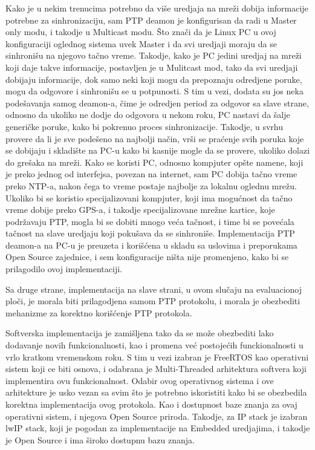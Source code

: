 \documentclass[a4paper,12pt, master]{etf}
\begin{document}
	Kako je u nekim trenucima potrebno da vi\v{s}e uredjaja na mre\v{z}i dobija
	informacije potrebne za sinhronizaciju, sam PTP deamon je konfigurisan da
	radi u Master only modu, i takodje u Multicast modu. \v{S}to zna\v{c}i da
	je Linux PC u ovoj konfiguraciji oglednog sistema uvek Master i da svi
	uredjaji moraju da se sinhroni\v{s}u na njegovo ta\v{c}no vreme. Takodje,
	kako je PC jedini uredjaj na mre\v{z}i koji daje takve informacije,
	postavljen je u Mulitcast mod, tako da svi uredjaji dobijaju informacije,
	dok samo neki koji mogu da prepoznaju odredjene poruke, mogu da odgovore i
	sinhroni\v{s}u se u potpunosti. S tim u vezi, dodata su jos neka
	pode\v{s}avanja samog deamon-a, \v{c}ime je odredjen period za odgovor sa
	slave strane, odnosno da ukoliko ne dodje do odgovora u nekom roku, PC
	nastavi da \v{s}alje generi\v{c}ke poruke, kako bi pokrenuo proces
	sinhronizacije. Takodje, u svrhu provere da li je sve pode\v{s}eno na
	najbolji na\v{c}in, vr\v{s}i se pra\'{c}enje svih poruka koje se dobijaju i
	skladi\v{s}te na PC-u kako bi kasnije mogle da se provere, ukoliko dolazi
	do gre\v{s}aka na mre\v{z}i. Kako se koristi PC, odnosno kompjuter
	op\v{s}te namene, koji je preko jednog od interfejsa, povezan na internet,
	sam PC dobija ta\v{c}no vreme preko NTP-a, nakon \v{c}ega to vreme postaje
	najbolje za lokalnu oglednu mre\v{z}u. Ukoliko bi se koristio
	specijalizovani kompjuter, koji ima mogu\'{c}nost da ta\v{c}no vreme dobije
	preko GPS-a, i takodje specijalizovane mre\v{z}ne kartice, koje
	podr\v{z}avaju PTP, mogla bi se dobiti mnogo ve\'{c}a ta\v{c}nost, i time
	bi se pove\'{c}ala ta\v{c}nost na slave uredjaju koji poku\v{s}ava da se
	sinhroni\v{s}e. Implementacija PTP deamon-a na PC-u je preuzeta i
	kori\v{s}\'{c}ena u skladu sa uslovima i preporukama Open Source zajednice,
	i sem konfiguracije ni\v{s}ta nije promenjeno, kako bi se prilagodilo ovoj
	implementaciji.

    Sa druge strane, implementacija na slave strani, u ovom slu\v{c}aju na
	evaluacionoj plo\v{c}i, je morala biti prilagodjena samom PTP protokolu, i
	morala je obezbediti mehanizme za korektno kori\v{s}\'{c}enje PTP protokola.

	Softverska implementacija je zami\v{s}ljena tako da se mo\v{z}e obezbediti
	lako dodavanje novih funkcionalnosti, kao i promena ve\'{c} postoje\'{c}ih
	funckionalnosti u vrlo kratkom vremenskom roku. S tim u vezi izabran je
	FreeRTOS kao operativni sistem koji ce biti osnova, i odabrana je
	Multi-Threaded arhitektura softvera koji implementira ovu funkcionalnost.
	Odabir ovog operativnog sistema i ove arhitekture je usko vezan sa svim
	\v{s}to je potrebno iskoristiti kako bi se obezbedila korektna
	implementacija ovog protokola. Kao i dostupnost baze znanja za ovaj
	operativni sistem, i njegova Open Source priroda. Takodje, za IP stack je
	izabran lwIP stack, koji je pogodan za implementacije na Embedded
	uredjajima, i takodje je Open Source i ima \v{s}iroko dostupnu bazu znanja.
\end{document}
